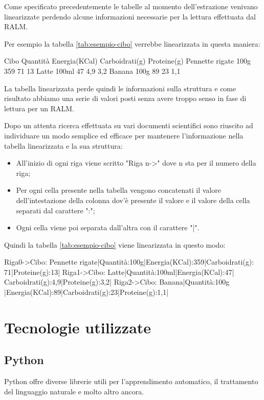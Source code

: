 Come specificato precedentemente le tabelle al momento dell'estrazione venivano linearizzate 
perdendo alcune informazioni necessarie per la lettura effettuata dal RALM. 

Per esempio la tabella \ref{tab:esempio-cibo} verrebbe linearizzata in questa maniera:
\begin{tcolorbox}[colback=white, colframe=black]
    Cibo Quantità Energia(KCal) Carboidrati(g) Proteine(g) Pennette rigate  100g  359  71  13 Latte 100ml 47 4,9 3,2 Banana  100g 89 23 1,1
\end{tcolorbox}

La tabella linearizzata perde quindi le informazioni sulla struttura e come risultato abbiamo una serie di valori posti senza avere troppo senso in fase di lettura per un RALM.

Dopo un attenta ricerca effettuata su vari documenti scientifici sono riuscito ad individuare un modo semplice ed efficace per mantenere 
l'informazione nella tabella linearizzata e la sua struttura:
\begin{itemize}
    \item All'inizio di ogni riga viene scritto "Riga n->" dove n sta per il numero della riga;
    \item Per ogni cella presente nella tabella vengono concatenati il valore dell'intestazione della colonna dov'è presente il valore e il valore della cella separati dal carattere ":";
    \item Ogni cella viene poi separata dall'altra con il carattere "|".
\end{itemize} 

Quindi la tabella \ref{tab:esempio-cibo} viene linearizzata in questo modo:
\begin{tcolorbox}[colback=white, colframe=black]
    Riga0->Cibo: Pennette rigate|Quantità:100g|Energia(KCal):359|Carboidrati(g): \\
    71|Proteine(g):13| Riga1->Cibo: Latte|Quantità:100ml|Energia(KCal):47| \\
    Carboidrati(g):4,9|Proteine(g):3,2| Riga2->Cibo: Banana|Quantità:100g \\
    |Energia(KCal):89|Carboidrati(g):23|Proteine(g):1,1|
\end{tcolorbox}


\section{Tecnologie utilizzate}
\subsection{Python}
Python offre diverse librerie utili per l'apprendimento automatico, il trattamento del linguaggio naturale e molto altro ancora.
